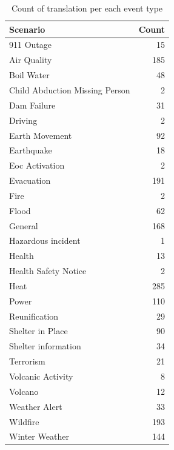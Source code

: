 \begin{table}
\centering
\begin{tabular}{lr}
\toprule
\textbf{Scenario} & \textbf{Count} \\
\midrule
911 Outage & 15 \\
Air Quality & 185 \\
Boil Water & 48 \\
Child Abduction Missing Person & 2 \\
Dam Failure & 31 \\
Driving & 2 \\
Earth Movement & 92 \\
Earthquake & 18 \\
Eoc Activation & 2 \\
Evacuation & 191 \\
Fire & 2 \\
Flood & 62 \\
General & 168 \\
Hazardous incident & 1 \\
Health & 13 \\
Health Safety Notice & 2 \\
Heat & 285 \\
Power & 110 \\
Reunification & 29 \\
Shelter in Place & 90 \\
Shelter information & 34 \\
Terrorism & 21 \\
Volcanic Activity & 8 \\
Volcano & 12 \\
Weather Alert & 33 \\
Wildfire & 193 \\
Winter Weather & 144 \\
\bottomrule
\end{tabular}
\caption{Count of translation per each event type}
\label{tab:domain_counts_combined}

\end{table}